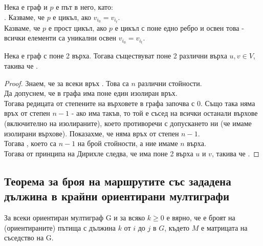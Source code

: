 \begin{definition}
    Нека \graf е граф и \(p\) е път в него, като: \\
    . 
    Казваме, че \(p\) е цикъл, ако \(v_{i_0} = v_{i_t}\). \\
    Казваме, че \(p\) е прост цикъл, ако \(p\) е цикъл с поне едно ребро и освен това - всички елементи 
    са уникални освен \(v_{i_0} = v_{i_t}\).
\end{definition}

\begin{lemma}
    Нека \graf е граф с поне 2 върха. Тогава съществуват поне 2 различни върха \(u, v \in V\), такива че 
    .
\end{lemma}
\begin{proof}
    Знаем, че за всеки връх . Това са \(n\) различни стойности. \\
    Да допуснем, че в графа има поне един изолиран връх. \\
    Тогава редицата от степените на върховете в графа започва с 0.
    Също така няма връх от степен \(n - 1\) - ако има такъв, то той е съсед на всички останали 
    върхове (включително на изолираните), което противоречи с допускането ни (че имаме изолирани върхове). 
    Показахме, че няма връх от степен \(n - 1\). \\
    Тогава , което са \(n - 1\) на брой стойности, 
    а ние имаме \(n\) върха. \\
    Тогава от принципа на Дирихле следва, че има поне 2 върха \(u\) и \(v\), такива че .
\end{proof}

\subsection{Теорема за броя на маршрутите със зададена дължина в крайни ориентирани мултиграфи}
\begin{theorem}
    За всеки ориентиран мултиграф G и за всяко \(k \ge 0\) е вярно, че  е броят на 
    (ориентираните) пътища с дължина \(k\) от \(i\) до \(j\) в \(G\), където \(M\) е матрицата на 
    съседство на G. 
\end{theorem}

